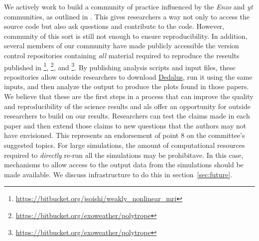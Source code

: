 \documentclass[12pt, titlepage]{aastex62}
\newcommand{\dedalus}{\href{http://dedalus-project.org}{Dedalus}}
\begin{document}
We actively work to build a community of practice influenced by the \emph{Enzo} and \emph{yt} communities, as outlined in \citet{2013arXiv1301.7064T}. This gives researchers a way not only to access the source code but also ask questions and contribute to the code. However, community of this sort is still not enough to ensure reproducibility. In addition, several members of our community have made publicly accessible the version control repositories containing \emph{all} material required to reproduce the reseults published in \citet{2017ApJ...841....1C,2017ApJ...841....2C}\footnote{\url{https://bitbucket.org/jsoishi/weakly_nonlinear_mri}}, \citet{2017PhRvF...2h3501A}\footnote{\url{https://bitbucket.org/exoweather/polytrope}}, and \citet{2018Bordwell}\footnote{\url{https://bitbucket.org/exoweather/polytrope}}. By publishing analysis scripts and input files, these repositories allow outside researchers to download \dedalus{}, run it using the same inputs, and then analyze the output to produce the plots found in those papers. We believe that these are the first steps in a process that can improve the quality and reproducibility of the science results and als offer an opportunity for outside researchers to build on our results. Researchers can test the claims made in each paper and then extend those claims to new questions that the authors may not have envisioned. This represents an endorsement of point 8 on the committee's suggested topics. For large simulations, the amount of computational resources required to \emph{directly} re-run all the simulations may be prohibitave. In this case, mechanisms to allow access to the output data from the simulations should be made available. We discuss infrastructure to do this in section~\ref{sec:future}.

\end{document}
